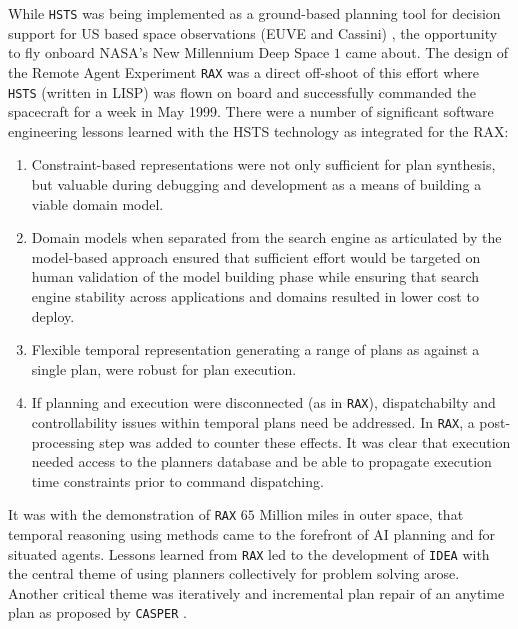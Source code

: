 While \texttt{HSTS} \cite{mus94} was being implemented as a
ground-based planning tool for decision support for US based space
observations (EUVE and Cassini) \cite{mus95}, the opportunity to fly
onboard NASA’s New Millennium Deep Space $1$ came about. The design of
the Remote Agent Experiment \texttt{RAX} \cite{pell97, bernard98,
  pell98, mus98, DS1report, rajan00, jonsson00} was a direct off-shoot
of this effort where \texttt{HSTS} (written in LISP) was flown on
board and successfully commanded the spacecraft for a week in May
1999. There were a number of significant software engineering lessons
learned with the HSTS technology as integrated for the RAX:

\begin{enumerate}

\item Constraint-based representations were not only sufficient for
  plan synthesis, but valuable during debugging and development as a
  means of building a viable domain model.

\item Domain models when separated from the search engine as
  articulated by the model-based approach \cite{williams96a} ensured
  that sufficient effort would be targeted on human validation of the
  model building phase while ensuring that search engine stability
  across applications and domains resulted in lower cost to deploy.

\item Flexible temporal representation generating a range of plans as
  against a single plan, were robust for plan execution.

\item If planning and execution were disconnected (as in
  \texttt{RAX}), dispatchabilty \cite{mus98a} and controllability
  \cite{morris00} issues within temporal plans need be addressed. In
  \texttt{RAX}, a post-processing step was added to counter these
  effects. It was clear that execution needed access to the planners
  database and be able to propagate execution time constraints prior
  to command dispatching.

\end{enumerate}

It was with the demonstration of \texttt{RAX} $65$ Million miles in
outer space, that temporal reasoning using methods came to the
forefront of AI planning and for situated agents. Lessons learned from
\texttt{RAX} led to the development of \texttt{IDEA}
\cite{mus02,mus04,Dias:2003ua,mus06} with the central theme of using
planners collectively for problem solving arose. Another critical
theme was iteratively and incremental plan repair of an anytime plan
\cite{Zaimag96} as proposed by \texttt{CASPER} \cite{chien00}.

